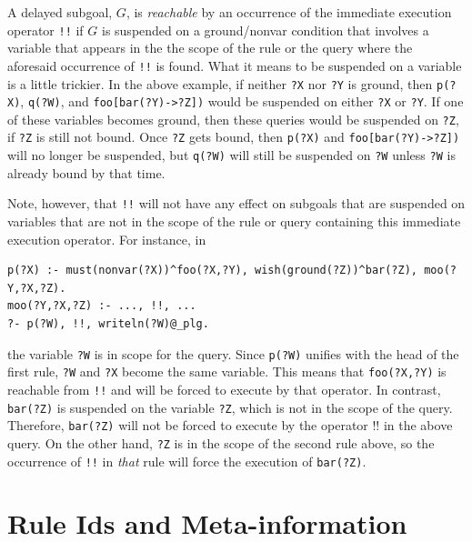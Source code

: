 \documentclass[11pt]{article}
\begin{document}
A delayed subgoal, $G$, is \emph{reachable} by an occurrence of
the immediate execution
operator \texttt{!!} 
if $G$ is suspended on a ground/nonvar condition that
involves a variable that appears in the the scope of the rule or the query
where the aforesaid occurrence of \texttt{!!} is found. 
What it means to be suspended on a variable is a little trickier.
In the above example, if neither \texttt{?X} nor \texttt{?Y} is ground,
then \texttt{p(?X)}, \texttt{q(?W)}, and \texttt{foo[bar(?Y)->?Z])} would
be suspended on either \texttt{?X} or \texttt{?Y}. If one of these
variables becomes ground, then these queries would be suspended on
\texttt{?Z}, if \texttt{?Z} is still not bound.  Once \texttt{?Z}  gets bound,
then \texttt{p(?X)} and \texttt{foo[bar(?Y)->?Z])} will no longer be
suspended, but \texttt{q(?W)} will still be suspended on \texttt{?W} unless
\texttt{?W} is already bound by that time.   

Note, however, that \texttt{!!} will not have any effect on subgoals that
are suspended on variables that are not in the scope of the rule or query
containing this
immediate execution operator. For instance, in
\begin{verbatim}
p(?X) :- must(nonvar(?X))^foo(?X,?Y), wish(ground(?Z))^bar(?Z), moo(?Y,?X,?Z).
moo(?Y,?X,?Z) :- ..., !!, ...
?- p(?W), !!, writeln(?W)@_plg.
\end{verbatim}
the variable \texttt{?W} is in scope for the query. Since
\texttt{p(?W)} unifies with the head of the first rule, \texttt{?W} and
\texttt{?X} become the same variable. This means that \texttt{foo(?X,?Y)}
is reachable from \texttt{!!} and will be forced to execute by that operator.
In contrast, \texttt{bar(?Z)} is suspended on the variable \texttt{?Z},
which is not in the scope of the query. Therefore, \texttt{bar(?Z)} will
not be forced to execute by the operator !! in the above query.   
On the other hand, \texttt{?Z} is in the scope of the second rule above, so
the occurrence of \texttt{!!} in \emph{that} rule will force the execution of
\texttt{bar(?Z)}.   


\section{Rule Ids and Meta-information}
\label{sec-rule-id}
\end{document}
